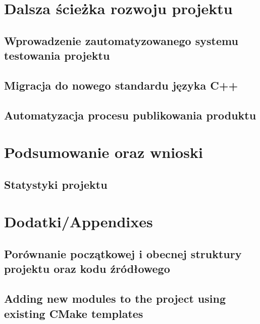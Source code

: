 \chapter{Dalsza ścieżka rozwoju projektu}
\label{cha:dalsze}

\section{Wprowadzenie zautomatyzowanego systemu testowania projektu}
\section{Migracja do nowego standardu języka C++}
\section{Automatyzacja procesu publikowania produktu}


\chapter{Podsumowanie oraz wnioski}
\label{cha:summary}

\section{Statystyki projektu}
\label{sec:stat}

\appendix
\chapter{Dodatki/Appendixes}
\label{cha:app}

\section{Porównanie początkowej i obecnej struktury projektu oraz kodu źródłowego}
\section{Adding new modules to the project using existing CMake templates}
\label{appendix:A2}

\newpage





